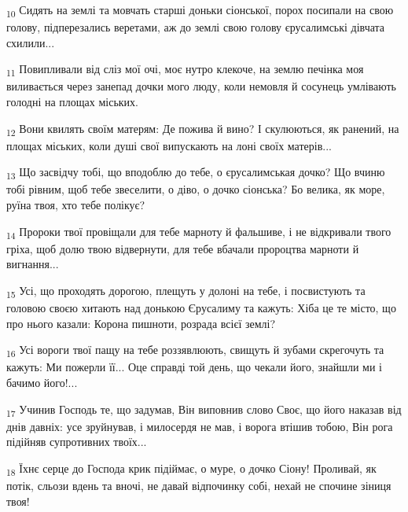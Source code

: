 \begin{tcolorbox}
\textsubscript{10} Сидять на землі та мовчать старші доньки сіонської, порох посипали на свою голову, підперезались веретами, аж до землі свою голову єрусалимські дівчата схилили...
\end{tcolorbox}
\begin{tcolorbox}
\textsubscript{11} Повипливали від сліз мої очі, моє нутро клекоче, на землю печінка моя виливається через занепад дочки мого люду, коли немовля й сосунець умлівають голодні на площах міських.
\end{tcolorbox}
\begin{tcolorbox}
\textsubscript{12} Вони квилять своїм матерям: Де пожива й вино? І скулюються, як ранений, на площах міських, коли душі свої випускають на лоні своїх матерів...
\end{tcolorbox}
\begin{tcolorbox}
\textsubscript{13} Що засвідчу тобі, що вподоблю до тебе, о єрусалимськая дочко? Що вчиню тобі рівним, щоб тебе звеселити, о діво, о дочко сіонська? Бо велика, як море, руїна твоя, хто тебе полікує?
\end{tcolorbox}
\begin{tcolorbox}
\textsubscript{14} Пророки твої провіщали для тебе марноту й фальшиве, і не відкривали твого гріха, щоб долю твою відвернути, для тебе вбачали пророцтва марноти й вигнання...
\end{tcolorbox}
\begin{tcolorbox}
\textsubscript{15} Усі, що проходять дорогою, плещуть у долоні на тебе, і посвистують та головою своєю хитають над донькою Єрусалиму та кажуть: Хіба це те місто, що про нього казали: Корона пишноти, розрада всієї землі?
\end{tcolorbox}
\begin{tcolorbox}
\textsubscript{16} Усі вороги твої пащу на тебе роззявлюють, свищуть й зубами скрегочуть та кажуть: Ми пожерли її... Оце справді той день, що чекали його, знайшли ми і бачимо його!...
\end{tcolorbox}
\begin{tcolorbox}
\textsubscript{17} Учинив Господь те, що задумав, Він виповнив слово Своє, що його наказав від днів давніх: усе зруйнував, і милосердя не мав, і ворога втішив тобою, Він рога підійняв супротивних твоїх...
\end{tcolorbox}
\begin{tcolorbox}
\textsubscript{18} Їхнє серце до Господа крик підіймає, о муре, о дочко Сіону! Проливай, як потік, сльози вдень та вночі, не давай відпочинку собі, нехай не спочине зіниця твоя!
\end{tcolorbox}

